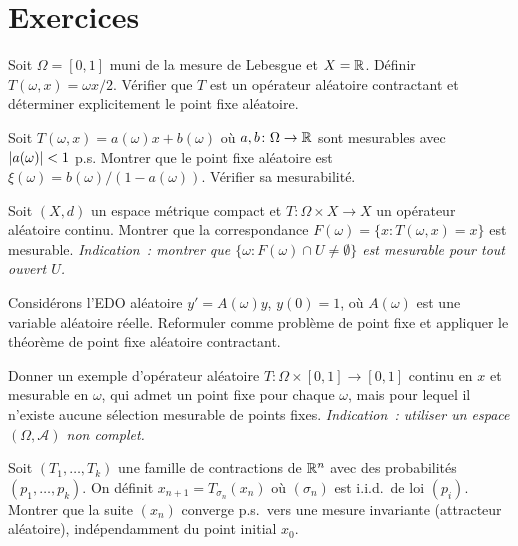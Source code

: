 \section{Exercices}

\begin{exercice}
Soit $\Omega = [0,1]$ muni de la mesure de Lebesgue et $X = \mathbb{R}$. D\'efinir
$T(\omega, x) = \omega x / 2$. V\'erifier que $T$ est un op\'erateur al\'eatoire
contractant et d\'eterminer explicitement le point fixe al\'eatoire.
\end{exercice}

\begin{exercice}
Soit $T(\omega, x) = a(\omega) x + b(\omega)$ o\`u $a, b\colon \Omega \to \mathbb{R}$ sont
mesurables avec $\left| a(\omega) \right| < 1$ p.s. Montrer que le point fixe al\'eatoire est
$\xi(\omega) = b(\omega) / (1 - a(\omega))$. V\'erifier sa mesurabilit\'e.
\end{exercice}

\begin{exercice}
Soit $(X, d)$ un espace m\'etrique compact et $T\colon \Omega \times X \to X$ un
op\'erateur al\'eatoire continu. Montrer que la correspondance
$F(\omega) = \{x : T(\omega, x) = x\}$ est mesurable.
\emph{Indication~: montrer que $\{\omega : F(\omega) \cap U \neq \emptyset\}$ est
mesurable pour tout ouvert $U$.}
\end{exercice}

\begin{exercice}
Consid\'erons l'EDO al\'eatoire $y' = A(\omega) y$, $y(0) = 1$, o\`u $A(\omega)$ est une
variable al\'eatoire r\'eelle. Reformuler comme probl\`eme de point fixe et appliquer le
th\'eor\`eme de point fixe al\'eatoire contractant.
\end{exercice}

\begin{exercice}
Donner un exemple d'op\'erateur al\'eatoire $T\colon \Omega \times [0,1] \to [0,1]$
continu en $x$ et mesurable en $\omega$, qui admet un point fixe pour chaque $\omega$,
mais pour lequel il n'existe aucune s\'election mesurable de points fixes.
\emph{Indication~: utiliser un espace $(\Omega, \mathcal{A})$ non complet.}
\end{exercice}

\begin{exercice}
Soit $(T_1, \ldots, T_k)$ une famille de contractions de $\mathbb{R}^n$ avec des probabilit\'es
$(p_1, \ldots, p_k)$. On d\'efinit $x_{n+1} = T_{\sigma_n}(x_n)$ o\`u $(\sigma_n)$ est
i.i.d.\ de loi $(p_i)$. Montrer que la suite $(x_n)$ converge p.s.\ vers une mesure
invariante (attracteur al\'eatoire), ind\'ependamment du point initial $x_0$.
\end{exercice}
